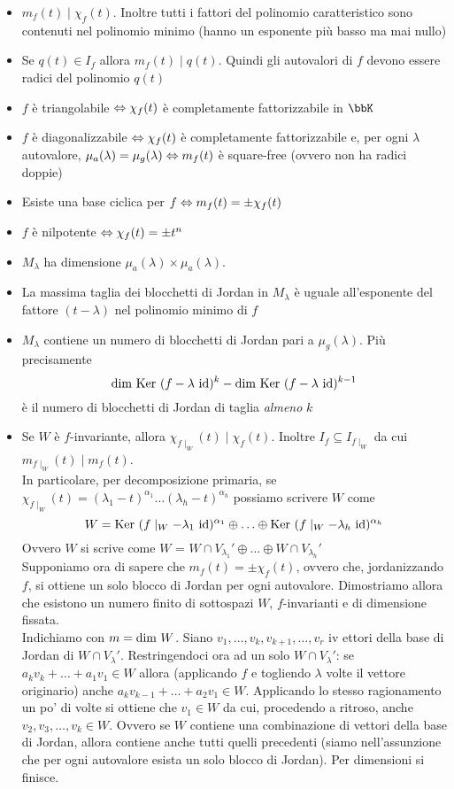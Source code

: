 \documentclass[a4paper,NoNotes,GeneralMath]{stdmdoc}
\begin{document}
	\begin{itemize}
		\item $m_f(t) \mid \chi_f(t)$. Inoltre tutti i fattori del polinomio caratteristico sono contenuti nel polinomio minimo (hanno un esponente più basso ma mai nullo)
		\item Se $q(t) \in I_f$ allora $m_f(t) \mid q(t)$. Quindi gli autovalori di $f$ devono essere radici del polinomio $q(t)$
		\item $f$ è triangolabile $\Leftrightarrow \chi_f(t)$ è completamente fattorizzabile in $\bbK$
		\item $f$ è diagonalizzabile $\Leftrightarrow \chi_f(t)$ è completamente fattorizzabile e, per ogni $\lambda$ autovalore, $\mu_a(\lambda) = \mu_g(\lambda) \Leftrightarrow m_f(t)$ è square-free (ovvero non ha radici doppie)
		\item Esiste una base ciclica per $f \Leftrightarrow m_f(t) = \pm \chi_f(t)$
		\item $f$ è nilpotente $\Leftrightarrow \chi_f(t) = \pm t^n$
		\item $M_\lambda$ ha dimensione $\mu_a(\lambda)\times\mu_a(\lambda)$.
		\item La massima taglia dei blocchetti di Jordan in $M_\lambda$ è uguale all'esponente del fattore $(t-\lambda)$ nel polinomio minimo di $f$
		\item $M_\lambda$ contiene un numero di blocchetti di Jordan pari a $\mu_g(\lambda)$. Più precisamente 
$$\Dim\Ker (f-\lambda\ \Id)^k-\Dim\Ker (f-\lambda\ \Id)^{k-1}$$
 è il numero di blocchetti di Jordan di taglia {\it almeno} $k$
		\item Se $W$ è $f$-invariante, allora $\chi_{f\mid_W}(t) \mid \chi_f(t)$. Inoltre $I_f \subseteq I_{f\mid_W}$ da cui $m_{f\mid_W}(t) \mid m_f(t)$. \\ In particolare, per decomposizione primaria, se $\chi_{f\mid_W}(t) = (\lambda_1-t)^{\alpha_1}\ldots(\lambda_h-t)^{\alpha_h}$ possiamo scrivere $W$ come $$W = \Ker (f\mid_W-\lambda_1\ \Id)^{\alpha_1} \oplus \ldots \oplus \Ker (f\mid_W-\lambda_h\ \Id)^{\alpha_h}$$ Ovvero $W$ si scrive come $W$ = $W\cap V_{\lambda_1}' \oplus \ldots \oplus W\cap V_{\lambda_h}'$ \\
		Supponiamo ora di sapere che $m_f(t) = \pm \chi_f(t)$, ovvero che, jordanizzando $f$, si ottiene un solo blocco di Jordan per ogni autovalore. Dimostriamo allora che esistono un numero finito di sottospazi $W$, $f$-invarianti e di dimensione fissata. \\
		Indichiamo con $m = \mbox{dim } W$. Siano $v_1, \ldots, v_k, v_{k+1}, \ldots, v_{r}$ iv ettori della base di Jordan di $W \cap V_{\lambda}'$. Restringendoci ora ad un solo $W \cap V_{\lambda}'$: se $a_kv_k+\ldots+a_1v_1 \in W$ allora (applicando $f$ e togliendo $\lambda$ volte il vettore originario) anche $a_kv_{k-1}+\ldots+a_2v_1 \in W$. Applicando lo stesso ragionamento un po' di volte si ottiene che $v_1 \in W$ da cui, procedendo a ritroso, anche $v_2, v_3, \ldots, v_k \in W$. Ovvero se $W$ contiene una combinazione di vettori della base di Jordan, allora contiene anche tutti quelli precedenti (siamo nell'assunzione che per ogni autovalore esista un solo blocco di Jordan). Per dimensioni si finisce.
	\end{itemize}
\end{document}
